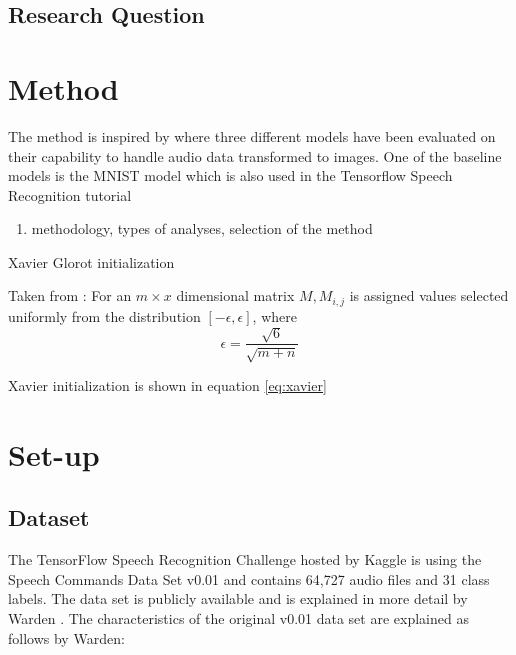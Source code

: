 \documentclass{article}
\theoremstyle{definition}
\theoremstyle{remark}
\begin{document}
\subsection{Research Question}




\section{Method}

The method is inspired by \cite{gouda2018speech} where three different models have been evaluated on their capability to handle audio data transformed to images. One of the baseline models is the MNIST model which is also used in the Tensorflow Speech Recognition tutorial \cite{tutorial}


\begin{enumerate}
	\item methodology, types of analyses, selection of the method
\end{enumerate}


Xavier Glorot initialization \cite{glorot2010understanding}

Taken from \cite{gouda2018speech}: For an $m \times x$ dimensional matrix $M, M_{i,j}$ is assigned values selected uniformly from the distribution $[-\epsilon, \epsilon]$, where
\begin{equation} \label{eq:xavier}
\epsilon = \frac{\sqrt{6}}{\sqrt{m + n}}
\end{equation}


Xavier initialization is shown in equation \ref{eq:xavier}



\section{Set-up} \label{setup}



\subsection{Dataset} 

The TensorFlow Speech Recognition Challenge hosted by Kaggle \cite{kaggle_challenge} is using the Speech Commands Data Set v0.01 and contains 64,727 audio files and 31 class labels. The data set is publicly available \cite{scd_v1} and is explained in more detail by Warden \cite{warden2018speech}. The characteristics of the original v0.01 data set are explained as follows by Warden:
\end{document}

